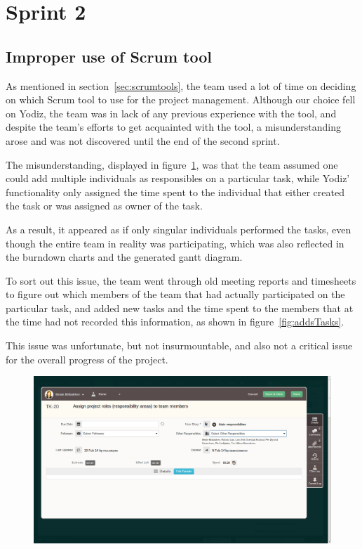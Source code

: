 \section{Sprint 2}

\subsection{Improper use of Scrum tool}
As mentioned in section~\ref{sec:scrumtools}, the team used a lot of time on deciding on which Scrum tool to use for the project management. Although our choice fell on Yodiz, the team was in lack of any previous experience with the tool, and despite the team's efforts to get acquainted with the tool, a misunderstanding arose and was not discovered until the end of the second sprint.

The misunderstanding, displayed in figure~\ref{fig:wrongUse}, was that the team assumed one could add multiple individuals as responsibles on a particular task, while Yodiz' functionality only assigned the time spent to the individual that either created the task or was assigned as owner of the task.

As a result, it appeared as if only singular individuals performed the tasks, even though the entire team in reality was participating, which was also reflected in the burndown charts and the generated gantt diagram. 

To sort out this issue, the team went through old meeting reports and timesheets to figure out which members of the team that had actually participated on the particular task, and added new tasks and the time spent to the members that at the time had not recorded this information, as shown in figure~\ref{fig:addsTasks}.

This issue was unfortunate, but not insurmountable, and also not a critical issue for the overall progress of the project.

\begin{figure}[H]
\includegraphics[width=\textwidth]{ch/sprints/fig/wrongUse.png}
\label{fig:wrongUse}
\end{figure}

